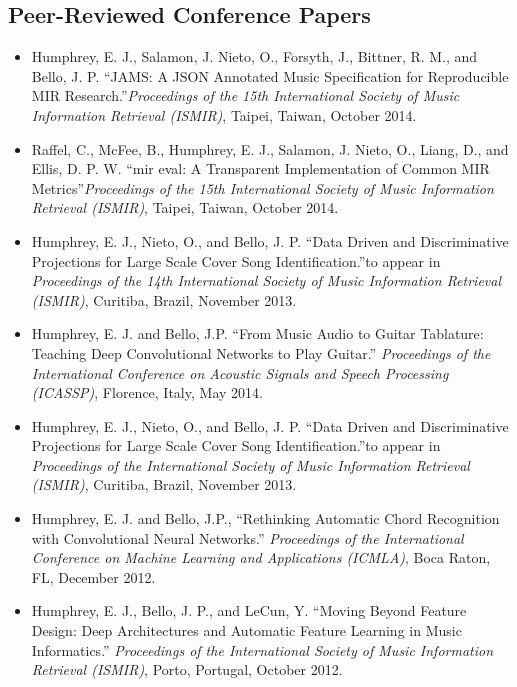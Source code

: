 \subsection{Peer-Reviewed Conference Papers}
\vspace{1em}
\begin{itemize}
\onehalfspacing

\item Humphrey, E. J., Salamon, J. Nieto, O., Forsyth, J., Bittner, R. M., and Bello, J. P. ``JAMS: A JSON Annotated Music Specification for Reproducible MIR Research.''{\it Proceedings of the 15th International Society of Music Information Retrieval (ISMIR)}, Taipei, Taiwan, October 2014.

\item Raffel, C., McFee, B., Humphrey, E. J., Salamon, J. Nieto, O., Liang, D., and Ellis, D. P. W. ``mir eval: A Transparent Implementation of Common MIR Metrics''{\it Proceedings of the 15th International Society of Music Information Retrieval (ISMIR)}, Taipei, Taiwan, October 2014.

\item Humphrey, E. J., Nieto, O., and Bello, J. P. ``Data Driven and Discriminative Projections for Large Scale Cover Song Identification.''{to appear in \it Proceedings of the 14th International Society of Music Information Retrieval (ISMIR)}, Curitiba, Brazil, November 2013.

\item Humphrey, E. J. and Bello, J.P. ``From Music Audio to Guitar Tablature: Teaching Deep Convolutional Networks to Play Guitar.'' {\it Proceedings of the International Conference on Acoustic Signals and Speech Processing (ICASSP)}, Florence, Italy, May 2014.

\item Humphrey, E. J., Nieto, O., and Bello, J. P. ``Data Driven and Discriminative Projections for Large Scale Cover Song Identification.''{to appear in \it Proceedings of the International Society of Music Information Retrieval (ISMIR)}, Curitiba, Brazil, November 2013.

\item Humphrey, E. J. and Bello, J.P., ``Rethinking Automatic Chord Recognition with Convolutional Neural Networks.'' {\it Proceedings of the International Conference on Machine Learning and Applications (ICMLA)}, Boca Raton, FL, December 2012.

\item Humphrey, E. J., Bello, J. P., and LeCun, Y. ``Moving Beyond Feature Design: Deep Architectures and Automatic Feature Learning in Music Informatics.'' {\it Proceedings of the International Society of Music Information Retrieval (ISMIR)}, Porto, Portugal, October 2012.


\end{itemize}
